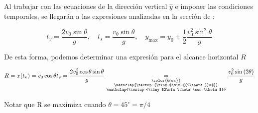 \documentclass[letterpaper,11pt]{article}
\begin{document}
\noindent Al trabajar con las ecuaciones de la dirección vertical $\hat{y}$ e imponer las condiciones temporales, se llegarán a las expresiones analizadas en la sección de :

\[t_v = \frac{2v_0\sin\theta}{g} ,\quad t_s = \frac{v_0\sin\theta}{g}, \quad y_{\text{max}} = y_0 + \frac{1}{2}\frac{v_0^2\sin^2\theta}{g}\]

\noindent De esta forma, podemos determinar una expresión para el alcance horizontal $R$

\begin{minipage}{0.65\linewidth}
    \[R = x(t_v) = v_0\cos\theta t_v = \frac{2v_0^2\cos\theta\sin\theta}{g} \underset{\substack{\color{blue}\uparrow \\ \mathclap{\textup{\tiny $\sin{(2\theta)}=$}}\\ 
    \mathclap{\textup{\tiny $2\sin\theta\cos\theta$}}}} {=}\frac{v_0^2\sin{(2\theta)}}{g}\]
\end{minipage}
\hfill
\begin{minipage}{0.3\linewidth}
    \begin{tcolorbox}[colback=white, colframe=blue, width=1\textwidth]
        Notar que R se maximiza cuando $\theta=45^{\circ} = \pi/4$
    \end{tcolorbox}
\end{minipage}
\end{document}
